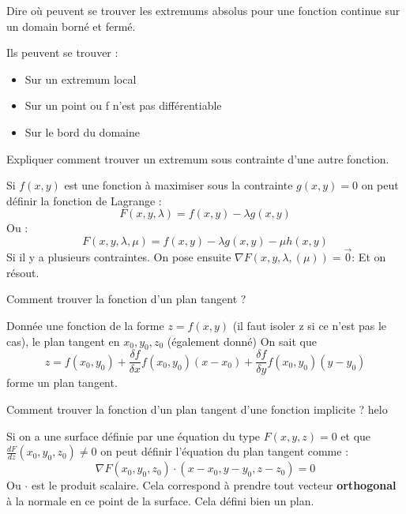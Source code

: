 \documentclass[12pt]{article}
\newcommand*{\xfield}[1]{\begin{mdframed}\centering #1\end{mdframed}\bigskip}
\newenvironment{note}{}{}
\begin{document}
\begin{note}
\xfield{Dire où peuvent se trouver les extremums absolus pour une fonction continue sur un domain borné et fermé.}
\xfield{Ils peuvent se trouver :
\begin{itemize}
\item Sur un extremum local
\item Sur un point ou f n'est pas différentiable
\item Sur le bord du domaine 
\end{itemize}}
\end{note}

\begin{note}
\xfield{Expliquer comment trouver un extremum sous contrainte d'une autre fonction.}
\xfield{Si $f(x,y)$ est une fonction à maximiser sous la contrainte $g(x,y) = 0$ on peut définir la fonction de Lagrange :
$$F(x,y,\lambda) = f(x,y) - \lambda g(x,y)$$
Ou :
$$F(x,y,\lambda, \mu) = f(x,y) - \lambda g(x,y) - \mu h(x,y)$$
Si il y a plusieurs contraintes.
On pose ensuite $\nabla F(x,y,\lambda, (\mu)) = \vec{0}$: Et on résout.}
\end{note}

\begin{note}
\xfield{Comment trouver la fonction d'un plan tangent ?}
\xfield{Donnée une fonction de la forme $z=f(x,y)$ (il faut isoler z si ce n'est pas le cas), le plan tangent en $x_0,y_0,z_0$ (également donné) On sait que
$$ z = f(x_0,y_0) + \frac{\delta f}{\delta x}f(x_0,y_0)(x-x_0) + \frac{\delta f}{\delta y}f(x_0,y_0)(y-y_0) $$ forme un plan tangent.}
\end{note}

\begin{note}
\xfield{Comment trouver la fonction d'un plan tangent d'une fonction implicite ?
	helo}
\xfield{Si on a une surface définie par une équation du type $F(x,y,z) = 0$ et que $\frac{dF}{dz}(x_0,y_0,z_0) \neq 0$ on peut définir l'équation du plan tangent comme :
$$\nabla F(x_0,y_0,z_0) \cdot (x-x_0,y-y_0,z-z_0) = 0$$
Ou $\cdot$ est le produit scalaire. Cela correspond à prendre tout vecteur \textbf{orthogonal} à la normale en ce point de la surface. Cela défini bien un plan.
}
\end{note}
\end{document}

